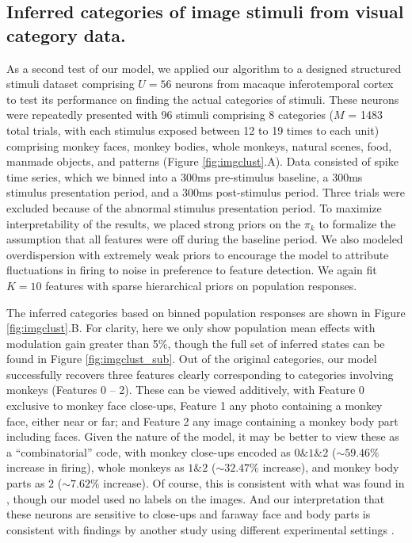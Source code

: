 \documentclass{nature}
\begin{document}
\subsection{Inferred categories of image stimuli from visual category data.}
\label{it_neuron_expt}
As a second test of our model, we applied our algorithm to a designed structured stimuli dataset comprising $U = 56$ neurons from macaque inferotemporal cortex \cite{McMahon2014-qq} to test its performance on finding the actual categories of stimuli. These neurons were repeatedly presented with 96 stimuli comprising 8 categories ($M$ = 1483 total trials, with each stimulus exposed between 12 to 19 times to each unit) comprising monkey faces, monkey bodies, whole monkeys, natural scenes, food, manmade objects, and patterns (Figure \ref{fig:imgclust}.A). Data consisted of spike time series, which we binned into a 300ms pre-stimulus baseline, a 300ms stimulus presentation period, and a 300ms post-stimulus period. Three trials were excluded because of the abnormal stimulus presentation period. To maximize interpretability of the results, we placed strong priors on the $\pi_k$ to formalize the assumption that all features were off during the baseline period. We also modeled overdispersion with extremely weak priors to encourage the model to attribute fluctuations in firing to noise in preference to feature detection. We again fit $K = 10$ features with sparse hierarchical priors on population responses.

The inferred categories based on binned population responses are shown in Figure \ref{fig:imgclust}.B. For clarity, here we only show population mean effects with modulation gain greater than 5\%, though the full set of inferred states can be found in Figure \ref{fig:imgclust_sub}. Out of the original categories, our model successfully recovers three features clearly corresponding to categories involving monkeys (Features 0 -- 2). These can be viewed additively, with Feature 0 exclusive to monkey face close-ups, Feature 1 any photo containing a monkey face, either near or far; and Feature 2 any image containing a monkey body part including faces. Given the nature of the model, it may be better to view these as a ``combinatorial'' code, with monkey close-ups encoded as $0\& 1\& 2$ ($\sim 59.46\%$ increase in firing), whole monkeys as $1 \& 2$ ($\sim 32.47\%$ increase), and monkey body parts as $2$ ($\sim 7.62\%$ increase). Of course, this is consistent with what was found in \cite{McMahon2014-qq}, though our model used no labels on the images. And our interpretation that these neurons are sensitive to close-ups and faraway face and body parts is consistent with findings by another study using different experimental settings \cite{McMahon5537}.
\end{document}
